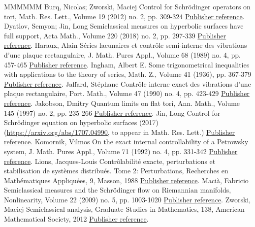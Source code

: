 \begin{thebibliography}{MMMMMM}
 Burq, Nicolas; Zworski, Maciej Control for Schrödinger operators on tori, Math. Res. Lett., Volume 19 (2012) no. 2, pp. 309-324 \href{https://ahl.centre-mersenne.org/item/AHL_2019__2__331_0/#BZ4}{Publisher reference}.
 Dyatlov, Semyon; Jin, Long Semiclassical measures on hyperbolic surfaces have full support, Acta Math., Volume 220 (2018) no. 2, pp. 297-339 \href{https://ahl.centre-mersenne.org/item/AHL_2019__2__331_0/#DJ}{Publisher reference}.
 Haraux, Alain Séries lacunaires et contrôle semi-interne des vibrations d’une plaque rectangulaire, J. Math. Pures Appl., Volume 68 (1989) no. 4, pp. 457-465 \href{https://ahl.centre-mersenne.org/item/AHL_2019__2__331_0/#Ha}{Publisher reference}.
 Ingham, Albert E. Some trigonometrical inequalities with applications to the theory of series, Math. Z., Volume 41 (1936), pp. 367-379 \href{https://ahl.centre-mersenne.org/item/AHL_2019__2__331_0/#ing}{Publisher reference}.
 Jaffard, Stéphane Contrôle interne exact des vibrations d’une plaque rectangulaire, Port. Math., Volume 47 (1990) no. 4, pp. 423-429 \href{https://ahl.centre-mersenne.org/item/AHL_2019__2__331_0/#Ja}{Publisher reference}.
 Jakobson, Dmitry Quantum limits on flat tori, Ann. Math., Volume 145 (1997) no. 2, pp. 235-266 \href{https://ahl.centre-mersenne.org/item/AHL_2019__2__331_0/#Jak}{Publisher reference}.
 Jin, Long Control for Schrödinger equation on hyperbolic surfaces (2017) (\url{https://arxiv.org/abs/1707.04990,} to appear in Math. Res. Lett.) \href{https://ahl.centre-mersenne.org/item/AHL_2019__2__331_0/#Ji}{Publisher reference}.
 Komornik, Vilmos On the exact internal controllability of a Petrowsky system, J. Math. Pures Appl., Volume 71 (1992) no. 4, pp. 331-342 \href{https://ahl.centre-mersenne.org/item/AHL_2019__2__331_0/#Ko}{Publisher reference}.
 Lions, Jacques-Louis Contrôlabilité exacte, perturbations et stabilisation de systèmes distribués. Tome 2: Perturbations, Recherches en Mathématiques Appliquées, 9, Masson, 1988 \href{https://ahl.centre-mersenne.org/item/AHL_2019__2__331_0/#Li}{Publisher reference}.
 Macià, Fabricio Semiclassical measures and the Schrödinger flow on Riemannian manifolds, Nonlinearity, Volume 22 (2009) no. 5, pp. 1003-1020 \href{https://ahl.centre-mersenne.org/item/AHL_2019__2__331_0/#Ma}{Publisher reference}.
 Zworski, Maciej Semiclassical analysis, Graduate Studies in Mathematics, 138, American Mathematical Society, 2012 \href{https://ahl.centre-mersenne.org/item/AHL_2019__2__331_0/#EZB}{Publisher reference}.
\end{thebibliography}
